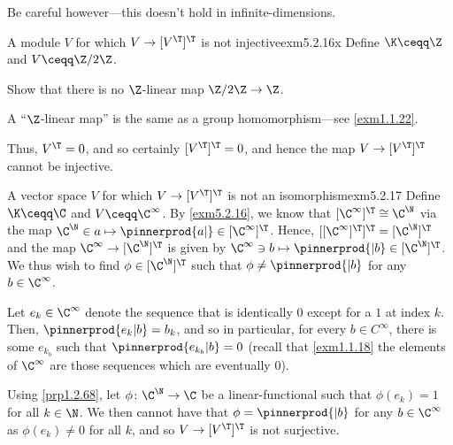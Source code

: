 Be careful however---this doesn't hold in infinite-dimensions.
\begin{exm}{A module $V$ for which $V\rightarrow [V^{\T}]^{\T}$ is not injective}{exm5.2.16x}
	Define $\K \ceqq \Z$ and $V\ceqq \Z /2\Z$.
	\begin{exr}[breakable=false]{}{}
		Show that there is no $\Z$-linear map $\Z /2\Z \rightarrow \Z$.
		\begin{rmk}
			A ``$\Z$-linear map'' is the same as a group homomorphism---see \cref{exm1.1.22}.
		\end{rmk}
	\end{exr}
	Thus, $V^{\T}=0$, and so certainly $[V^{\T}]^{\T}=0$, and hence the map $V\rightarrow [V^{\T}]^{\T}$ cannot be injective.
\end{exm}
\begin{exm}{A vector space $V$ for which $V\rightarrow [V^{\T}]^{\T}$ is not an isomorphism}{exm5.2.17}
	Define $\K \ceqq \C$ and $V\ceqq \C ^{\infty}$.  By \cref{exm5.2.16}, we know that $[\C ^{\infty}]^{\T}\cong \C ^{\N}$ via the map $\C ^{\N}\in a\mapsto \pinnerprod{a|}\in [\C ^{\infty}]^{\T}$.  Hence, $[[\C ^{\infty}]^{\T}]^{\T}=[\C ^{\N}]^{\T}$ and the map $\C ^{\infty}\rightarrow [\C ^{\N}]^{\T}$ is given by $\C ^{\infty}\ni b\mapsto \pinnerprod{|b}\in [\C ^{\N}]^{\T}$.  We thus wish to find $\phi \in [\C ^{\N}]^{\T}$ such that $\phi \neq \pinnerprod{|b}$ for any $b\in \C ^{\infty}$.
	
	Let $e_k\in \C ^{\infty}$ denote the sequence that is identically $0$ except for a $1$ at index $k$.  Then, $\pinnerprod{e_k|b}=b_k$, and so in particular, for every $b\in C^{\infty}$, there is some $e_{k_b}$ such that $\pinnerprod{e_{k_b}|b}=0$ (recall that \cref{exm1.1.18} the elements of $\C ^{\infty}$ are those sequences which are eventually $0$).
	
	Using \cref{prp1.2.68}, let $\phi \colon \C ^{\N}\rightarrow \C$ be a linear-functional such that $\phi (e_k)=1$ for all $k\in \N$.  We then cannot have that $\phi =\pinnerprod{|b}$ for any $b\in \C ^{\infty}$ as $\phi (e_k)\neq 0$ for all $k$, and so $V\rightarrow [V^{\T}]^{\T}$ is not surjective.
\end{exm}


